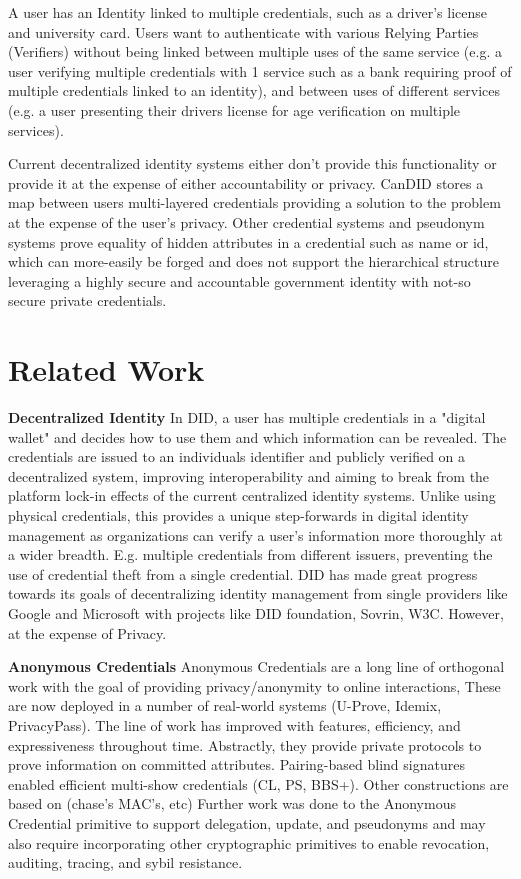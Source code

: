 A user has an Identity linked to multiple credentials, such as a driver's license and university card. Users want to authenticate with various Relying Parties (Verifiers) without being linked between multiple uses of the same service (e.g. a user verifying multiple credentials with 1 service such as a bank requiring proof of multiple credentials linked to an identity), and between uses of different services (e.g. a user presenting their drivers license for age verification on multiple services).

Current decentralized identity systems either don't provide this functionality or provide it at the expense of either accountability or privacy. CanDID stores a map between users multi-layered credentials providing a solution to the problem at the expense of the user's privacy. Other credential systems and pseudonym systems prove equality of hidden attributes in a credential such as name or id, which can more-easily be forged and does not support the hierarchical structure leveraging a highly secure and accountable government identity with not-so secure private credentials.

\newpage




\section{Related Work}
\textbf{Decentralized Identity}
In DID, a user has multiple credentials in a "digital wallet" and decides how to use them and which information can be revealed. The credentials are issued to an individuals identifier and publicly verified on a decentralized system, improving interoperability and aiming to break from the platform lock-in effects of the current centralized identity systems. Unlike using physical credentials, this provides a unique step-forwards in digital identity management as organizations can verify a user's information more thoroughly at a wider breadth. E.g. multiple credentials from different issuers, preventing the use of credential theft from a single credential. DID has made great progress towards its goals of decentralizing identity management from single providers like Google and Microsoft with projects like DID foundation, Sovrin, W3C. However, at the expense of Privacy.

\noindent \textbf{Anonymous Credentials}
Anonymous Credentials are a long line of orthogonal work with the goal of providing privacy/anonymity to online interactions, These are now deployed in a number of real-world systems (U-Prove, Idemix, PrivacyPass).  
The line of work has improved with features, efficiency, and expressiveness throughout time. 
Abstractly, they provide private protocols to prove information on committed attributes. 
Pairing-based blind signatures enabled efficient multi-show credentials (CL, PS, BBS+).
Other constructions are based on (chase's MAC's, etc) 
Further work was done to the Anonymous Credential primitive to support delegation, update, and pseudonyms and may also require incorporating other cryptographic primitives to enable revocation, auditing, tracing, and sybil resistance. 

